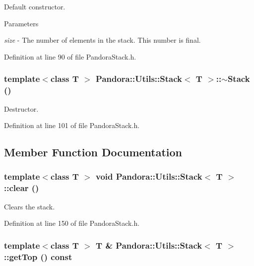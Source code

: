 Default constructor. 
\begin{DoxyParams}{Parameters}
\item[{\em size}]-\/ The number of elements in the stack. This number is final. \end{DoxyParams}


Definition at line 90 of file PandoraStack.h.\hypertarget{classPandora_1_1Utils_1_1Stack_a57c562706664edfabf43169405d5c247}{
\subsubsection[{$\sim$Stack}]{\setlength{\rightskip}{0pt plus 5cm}template$<$class T $>$ {\bf Pandora::Utils::Stack}$<$ T $>$::$\sim${\bf Stack} ()}}
\label{classPandora_1_1Utils_1_1Stack_a57c562706664edfabf43169405d5c247}


Destructor. 

Definition at line 101 of file PandoraStack.h.

\subsection{Member Function Documentation}
\hypertarget{classPandora_1_1Utils_1_1Stack_acbedc5107a2e03fe9a53d044efdcbabf}{
\subsubsection[{clear}]{\setlength{\rightskip}{0pt plus 5cm}template$<$class T $>$ void {\bf Pandora::Utils::Stack}$<$ T $>$::clear ()}}
\label{classPandora_1_1Utils_1_1Stack_acbedc5107a2e03fe9a53d044efdcbabf}


Clears the stack. 

Definition at line 150 of file PandoraStack.h.\hypertarget{classPandora_1_1Utils_1_1Stack_a9bdcdee9e004ce12b8dcfc36663d0eac}{
\subsubsection[{getTop}]{\setlength{\rightskip}{0pt plus 5cm}template$<$class T $>$ T \& {\bf Pandora::Utils::Stack}$<$ T $>$::getTop () const}}
\label{classPandora_1_1Utils_1_1Stack_a9bdcdee9e004ce12b8dcfc36663d0eac}



